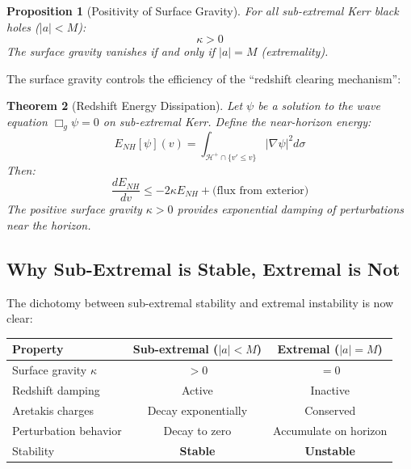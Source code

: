 \documentclass[12pt,a4paper]{article}
\newtheorem{theorem}{Theorem}[section]
\newtheorem{proposition}[theorem]{Proposition}
\begin{document}
\begin{proposition}[Positivity of Surface Gravity]
For all sub-extremal Kerr black holes ($|a| < M$):
\begin{equation}
\kappa > 0
\end{equation}
The surface gravity vanishes if and only if $|a| = M$ (extremality).
\end{proposition}

The surface gravity controls the efficiency of the ``redshift clearing mechanism'':

\begin{theorem}[Redshift Energy Dissipation]\label{thm:redshift}
Let $\psi$ be a solution to the wave equation $\Box_g \psi = 0$ on sub-extremal Kerr. Define the near-horizon energy:
\begin{equation}
E_{NH}[\psi](v) = \int_{\mathcal{H}^+ \cap \{v' \leq v\}} |\nabla \psi|^2 d\sigma
\end{equation}
Then:
\begin{equation}
\frac{d E_{NH}}{dv} \leq -2\kappa E_{NH} + \text{(flux from exterior)}
\end{equation}
The positive surface gravity $\kappa > 0$ provides exponential damping of perturbations near the horizon.
\end{theorem}

\subsection{Why Sub-Extremal is Stable, Extremal is Not}

The dichotomy between sub-extremal stability and extremal instability is now clear:

\begin{center}
\begin{tabular}{@{}lcc@{}}
\toprule
\textbf{Property} & \textbf{Sub-extremal} ($|a| < M$) & \textbf{Extremal} ($|a| = M$) \\
\midrule
Surface gravity $\kappa$ & $> 0$ & $= 0$ \\
Redshift damping & Active & Inactive \\
Aretakis charges & Decay exponentially & Conserved \\
Perturbation behavior & Decay to zero & Accumulate on horizon \\
Stability & \textbf{Stable} & \textbf{Unstable} \\
\bottomrule
\end{tabular}
\end{center}
\end{document}
